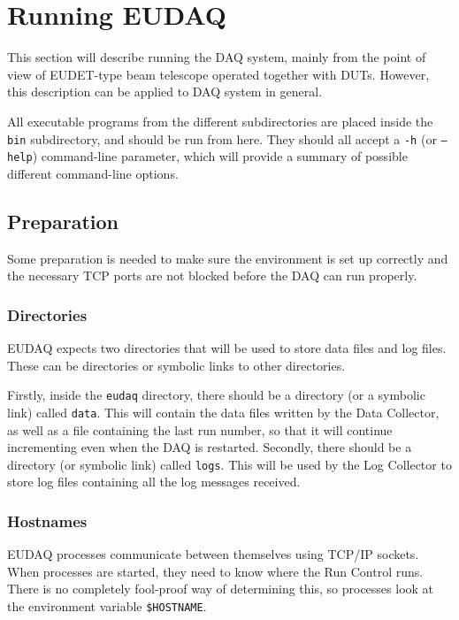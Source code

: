 \section{Running EUDAQ}
This section will describe running the DAQ system, mainly from the point of view of EUDET-type beam telescope \cite{telescopeWikiUserManual} operated together with \gls{DUT}s.
However, this description can be applied to DAQ system in general.

All executable programs from the different subdirectories are placed inside the \texttt{bin} subdirectory, and should be run from here. They should all accept a \texttt{-h} (or \texttt{--help}) command-line parameter, which will provide a summary of possible different command-line options.

\subsection{Preparation}
Some preparation is needed to make sure the environment is set up correctly and
the necessary TCP ports are not blocked before the DAQ can run properly.

\subsubsection{Directories}
EUDAQ expects two directories that will be used to store data files and log files.
These can be directories or symbolic links to other directories.

Firstly, inside the \texttt{eudaq} directory, there should be a directory (or a symbolic link) called \texttt{data}.
This will contain the data files written by the Data Collector, as well as a file containing the last run number,
so that it will continue incrementing even when the DAQ is restarted. 
Secondly, there should be a directory (or symbolic link) called \texttt{logs}.
This will be used by the Log Collector to store log files containing all the log messages received.

\subsubsection{Hostnames}
EUDAQ processes communicate between themselves using TCP/IP sockets.
When processes are started, they need to know where the Run Control runs.
There is no completely fool-proof way of determining this,
so processes look at the environment variable \texttt{\$HOSTNAME}.

